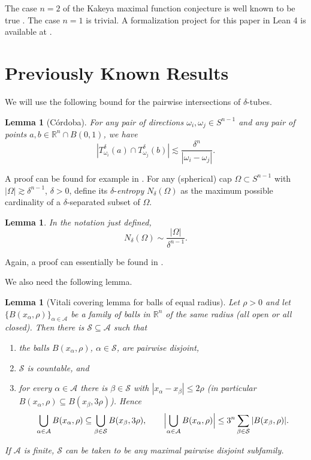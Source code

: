 \documentclass[11pt, letterpaper]{nyjm}
\newtheorem{lemma}[theorem]{Lemma}
\newcommand{\R}{\mathbb{R}}
\begin{document}
	The case $n = 2$ of the Kakeya maximal function conjecture is well known to be
	true \cite{Kroc}. The case $n = 1$ is trivial.
	A formalization project for this paper in Lean 4 is available at
	\cite{Aspegren2026Lean}.
	\section{Previously Known Results}
	
	We will use the following bound for the pairwise intersections of $\delta$-tubes.
	
	\begin{lemma}[C\'ordoba]\label{lem:cordoba}
		For any pair of directions $\omega_i, \omega_j \in S^{n-1}$ and any pair of
		points $a, b \in \R^n \cap B(0,1)$, we have
		\[
		|T^{\delta}_{\omega_i}(a) \cap T^{\delta}_{\omega_j}(b)|
		\lesssim \frac{\delta^n}{|\omega_i - \omega_j|}.
		\]
	\end{lemma}
	
	A proof can be found for example in \cite{Kroc}. For any (spherical) cap
	$\Omega \subset S^{n-1}$ with $|\Omega| \gtrsim \delta^{n-1}$, $\delta > 0$,
	define its $\delta$-\emph{entropy} $N_\delta(\Omega)$ as the maximum possible
	cardinality of a $\delta$-separated subset of $\Omega$.
	
	\begin{lemma}\label{lem:entropy}
		In the notation just defined,
		\[
		N_\delta(\Omega) \sim \frac{|\Omega|}{\delta^{n-1}}.
		\]
	\end{lemma}
	
	Again, a proof can essentially be found in \cite{Kroc}.
	
	We also need the following lemma.
	\begin{lemma}[Vitali covering lemma for balls of equal radius]
		\label{lem:vitali-equal}
		Let $\rho>0$ and let $\{B(x_\alpha,\rho)\}_{\alpha\in\mathcal A}$ be a family of balls in $\mathbb R^n$
		of the same radius (all open or all closed). Then there is $\mathcal S\subseteq\mathcal A$ such that
		\begin{enumerate}
			\item[(i)] the balls $B(x_\alpha,\rho)$, $\alpha\in\mathcal S$, are pairwise disjoint,
			\item[(ii)] $\mathcal S$ is countable, and
			\item[(iii)] for every $\alpha\in\mathcal A$ there is $\beta\in\mathcal S$ with
			$|x_\alpha-x_\beta|\le2\rho$ (in particular $B(x_\alpha,\rho)\subseteq B(x_\beta,3\rho)$). Hence
			\[
			\bigcup_{\alpha\in\mathcal A}B(x_\alpha,\rho)\subseteq\bigcup_{\beta\in\mathcal S}B(x_\beta,3\rho),
			\qquad
			\Bigl|\bigcup_{\alpha\in\mathcal A}B(x_\alpha,\rho)\Bigr|\le3^n\sum_{\beta\in\mathcal S}|B(x_\beta,\rho)|.
			\]
		\end{enumerate}
		If $\mathcal A$ is finite, $\mathcal S$ can be taken to be any maximal pairwise disjoint subfamily.
	\end{lemma}
	
\end{document}
